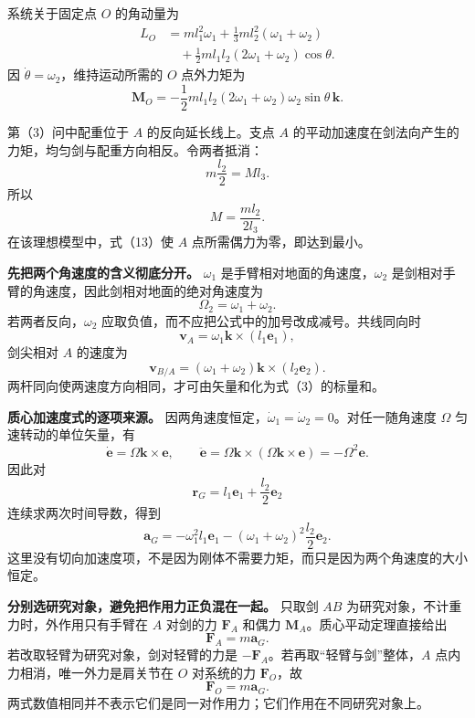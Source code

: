\documentclass[12pt,a4paper,UTF8]{ctexart}
\begin{document}
系统关于固定点 \(O\) 的角动量为 \[
\begin{aligned}
L_O
&=m l_1^2\omega_1
+\frac13m l_2^2(\omega_1+\omega_2)\\
&\quad+\frac12m l_1l_2(2\omega_1+\omega_2)\cos\theta.
\end{aligned} \tag{10}
\] 因 \(\dot\theta=\omega_2\)，维持运动所需的 \(O\) 点外力矩为 \[
\boxed{
\boldsymbol M_O
=-\frac12m l_1l_2(2\omega_1+\omega_2)
\omega_2\sin\theta\,\boldsymbol k
}. \tag{11}
\]

第（3）问中配重位于 \(A\) 的反向延长线上。支点 \(A\)
的平动加速度在剑法向产生的力矩，均匀剑与配重方向相反。令两者抵消： \[
m\frac{l_2}{2}=Ml_3. \tag{12}
\] 所以 \[
\boxed{M=\frac{ml_2}{2l_3}}. \tag{13}
\] 在该理想模型中，式（13）使 \(A\) 点所需偶力为零，即达到最小。

\textbf{先把两个角速度的含义彻底分开。} \(\omega_1\)
是手臂相对地面的角速度，\(\omega_2\)
是剑相对手臂的角速度，因此剑相对地面的绝对角速度为 \[
\Omega_2=\omega_1+\omega_2.
\] 若两者反向，\(\omega_2\)
应取负值，而不应把公式中的加号改成减号。共线同向时 \[
\boldsymbol v_A=\omega_1\boldsymbol k\times(l_1\boldsymbol e_1),
\] 剑尖相对 \(A\) 的速度为 \[
\boldsymbol v_{B/A}=(\omega_1+\omega_2)
\boldsymbol k\times(l_2\boldsymbol e_2).
\] 两杆同向使两速度方向相同，才可由矢量和化为式（3）的标量和。

\textbf{质心加速度式的逐项来源。}
因两角速度恒定，\(\dot\omega_1=\dot\omega_2=0\)。对任一随角速度
\(\Omega\) 匀速转动的单位矢量，有 \[
\dot{\boldsymbol e}=\Omega\boldsymbol k\times\boldsymbol e,
\qquad
\ddot{\boldsymbol e}
=\Omega\boldsymbol k\times
(\Omega\boldsymbol k\times\boldsymbol e)
=-\Omega^2\boldsymbol e.
\] 因此对 \[
\boldsymbol r_G=l_1\boldsymbol e_1+\frac{l_2}{2}\boldsymbol e_2
\] 连续求两次时间导数，得到 \[
\boldsymbol a_G
=-\omega_1^2l_1\boldsymbol e_1
-(\omega_1+\omega_2)^2\frac{l_2}{2}\boldsymbol e_2.
\]
这里没有切向加速度项，不是因为刚体不需要力矩，而只是因为两个角速度的大小恒定。

\textbf{分别选研究对象，避免把作用力正负混在一起。} 只取剑 \(AB\)
为研究对象，不计重力时，外作用只有手臂在 \(A\) 对剑的力
\(\boldsymbol F_A\) 和偶力 \(\boldsymbol M_A\)。质心平动定理直接给出 \[
\boldsymbol F_A=m\boldsymbol a_G.
\] 若改取轻臂为研究对象，剑对轻臂的力是
\(-\boldsymbol F_A\)。若再取``轻臂与剑''整体，\(A\)
点内力相消，唯一外力是肩关节在 \(O\) 对系统的力 \(\boldsymbol F_O\)，故
\[
\boldsymbol F_O=m\boldsymbol a_G.
\] 两式数值相同并不表示它们是同一对作用力；它们作用在不同研究对象上。
\end{document}
